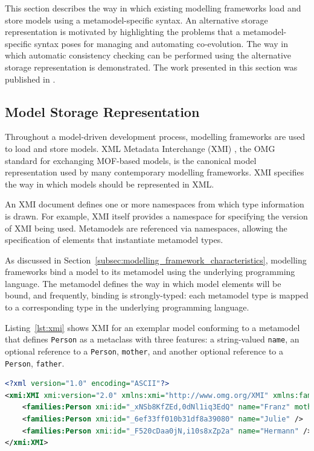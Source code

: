 This section describes the way in which existing modelling frameworks load and store models using a metamodel-specific syntax. An alternative storage representation is motivated by highlighting the problems that a metamodel-specific syntax poses for managing and automating co-evolution. The way in which automatic consistency checking can be performed using the alternative storage representation is demonstrated. The work presented in this section was published in \cite{rose09enhanced}.


\subsection{Model Storage Representation}
Throughout a model-driven development process, modelling frameworks are used to load and store models. XML Metadata Interchange (XMI) \cite{xmi}, the OMG standard for exchanging MOF-based models, is the canonical model representation used by many contemporary modelling frameworks. XMI specifies the way in which models should be represented in XML.

An XMI document defines one or more namespaces from which type information is drawn. For example, XMI itself provides a namespace for specifying the version of XMI being used. Metamodels are referenced via namespaces, allowing the specification of elements that instantiate metamodel types.

As discussed in Section~\ref{subsec:modelling_framework_characteristics}, modelling frameworks bind a model to its metamodel using the underlying programming language. The metamodel defines the way in which model elements will be bound, and frequently, binding is strongly-typed: each metamodel type is mapped to a corresponding type in the underlying programming language.

Listing~\ref{lst:xmi} shows XMI for an exemplar model conforming to a metamodel that defines \texttt{Person} as a metaclass with three features: a string-valued \texttt{name}, an optional reference to a \texttt{Person}, \texttt{mother}, and another optional reference to a \texttt{Person}, \texttt{father}.

\begin{lstlisting}[caption=Exemplar person model in XMI, label=lst:xmi, language=XML]
<?xml version="1.0" encoding="ASCII"?>
<xmi:XMI xmi:version="2.0" xmlns:xmi="http://www.omg.org/XMI" xmlns:families="http://www.cs.york.ac.uk/families">
	<families:Person xmi:id="_xNSb8KfZEd,0dNl1iq3EdQ" name="Franz" mother="_6ef33ff010b31df8a39080" father="_F520cDaa0jN,i10s8xZp2a" />
	<families:Person xmi:id="_6ef33ff010b31df8a39080" name="Julie" />
	<families:Person xmi:id="_F520cDaa0jN,i10s8xZp2a" name="Hermann" />
</xmi:XMI>
\end{lstlisting}

